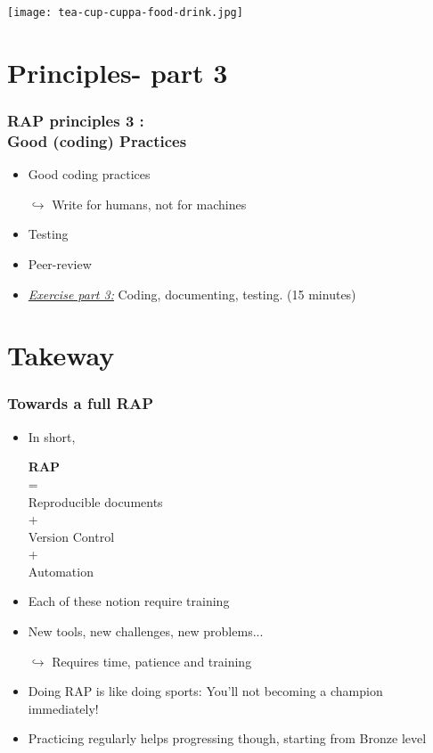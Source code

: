 \documentclass[xcolor=x11names,compress]{beamer}
\renewcommand{\(}{\begin{columns}}
\renewcommand{\)}{\end{columns}}
\newcommand{\<}[1]{\begin{column}{#1}}
\renewcommand{\>}{\end{column}}
\begin{document}
\begin{frame}
\begin{center}
\Large{ \color{brique}{Tea Break}}
\vspace{0.5cm}

\texttt{[image: tea-cup-cuppa-food-drink.jpg]}
\end{center}
\end{frame}


\section{Principles- part 3}

\begin{frame}[<+->]
   \frametitle{RAP principles 3 :  \\Good (coding) Practices}
   \pause
    \begin{itemize}[<+->]
     \item Good coding practices
     \item[$\hookrightarrow$] Write for humans, not for machines
     \item Testing
     \item Peer-review
     \item \href{https://sergegoussev.github.io/ESCAP_RAP_class/docs/teaching_materials/sept_18/sept_18_session.html\#principle-6-good-coding-practices}{\emph{Exercise part 3:}}  Coding, documenting, testing. (15 minutes)
    \end{itemize}
\end{frame}


\section{Takeway}

\begin{frame}
\frametitle{Towards a full RAP}

 \begin{itemize}[<+->]
        \item In short,\\
        \begin{center} \textbf{RAP}\\ =\\ Reproducible documents\\+ \\ Version Control \\+ \\ Automation \\  \end{center}
        \item Each of these notion require training
        \item New tools, new challenges, new problems...
        \item[$\hookrightarrow$]  Requires time, patience and training
        \item Doing RAP is like doing sports: You'll not becoming a champion immediately!
        \item Practicing regularly helps progressing though,  starting from Bronze level
    \end{itemize}
\end{frame}
\end{document}
